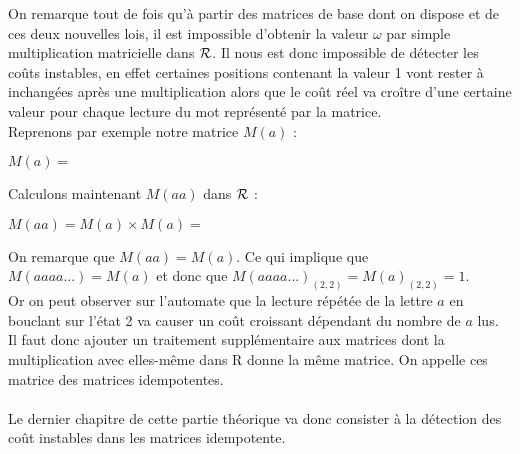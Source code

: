 \documentclass{report}
\begin{document}
On remarque tout de fois qu'à partir des matrices de base dont on dispose et de ces deux nouvelles lois, il est impossible d'obtenir la valeur $\omega$ par simple multiplication matricielle dans $\mathcal{R}$. Il nous est donc impossible de détecter les coûts instables, en effet certaines positions contenant la valeur 1 vont rester à inchangées après une multiplication alors que le coût réel va croître d'une certaine valeur pour chaque lecture du mot représenté par la matrice.\\

Reprenons par exemple notre matrice $M(a)$ : \\
\begin{center}
$M(a)=$
\end{center}

Calculons maintenant $M(aa)$ dans $\mathcal{R}$ :

\begin{center}
$M(aa) = M(a) \times M(a) =$
\end{center}

On remarque que $M(aa) = M(a)$. Ce qui implique que $M(aaaa...) = M(a)$ et donc que $M(aaaa...)_{(2,2)} = M(a)_{(2,2)}=1$. \\
Or on peut observer sur l'automate que la lecture répétée de la lettre $a$ en bouclant sur l'état 2 va causer un coût croissant dépendant du nombre de $a$ lus. Il faut donc ajouter un traitement supplémentaire aux matrices dont la multiplication avec elles-même dans R donne la même matrice. On appelle ces matrice des matrices idempotentes.\\\\
Le dernier chapitre de cette partie théorique va donc consister à la détection des coût instables dans les matrices idempotente.
\end{document}
